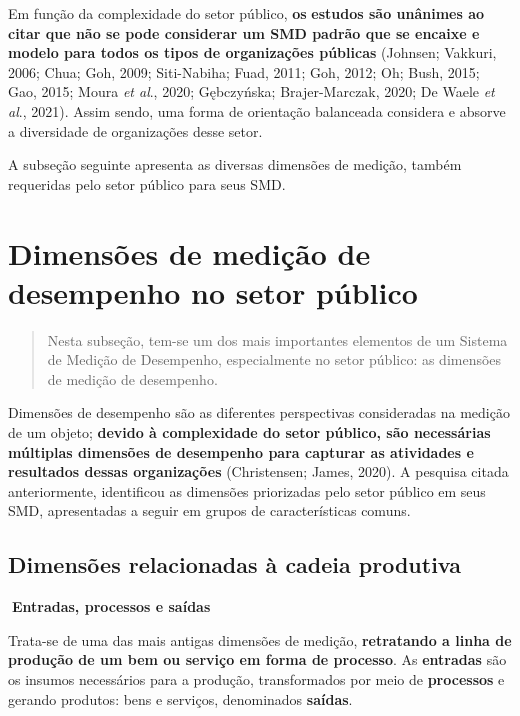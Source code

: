 \documentclass[
  letterpaper,
  DIV=11,
  numbers=noendperiod]{scrreprt}
\begin{document}
Em função da complexidade do setor público, \textbf{os} \textbf{estudos
são unânimes ao citar que não se pode considerar um SMD padrão que se
encaixe e modelo para todos os tipos de organizações públicas} (Johnsen;
Vakkuri, 2006; Chua; Goh, 2009; Siti-Nabiha; Fuad, 2011; Goh, 2012; Oh;
Bush, 2015; Gao, 2015; Moura \emph{et al}., 2020; Gębczyńska;
Brajer-Marczak, 2020; De Waele \emph{et al}., 2021). Assim sendo, uma
forma de orientação balanceada considera e absorve a diversidade de
organizações desse setor.

A subseção seguinte apresenta as diversas dimensões de medição, também
requeridas pelo setor público para seus SMD.

\hypertarget{dimensuxf5es-de-mediuxe7uxe3o-de-desempenho-no-setor-puxfablico}{%
\chapter{Dimensões de medição de desempenho no setor
público}\label{dimensuxf5es-de-mediuxe7uxe3o-de-desempenho-no-setor-puxfablico}}

\begin{quote}
Nesta subseção, tem-se um dos mais importantes elementos de um Sistema
de Medição de Desempenho, especialmente no setor público: as dimensões
de medição de desempenho.
\end{quote}

Dimensões de desempenho são as diferentes perspectivas consideradas na
medição de um objeto; \textbf{devido à complexidade do setor público,
são necessárias múltiplas dimensões de desempenho para capturar as
atividades e resultados dessas organizações} (Christensen; James, 2020).
A pesquisa citada anteriormente, identificou as dimensões priorizadas
pelo setor público em seus SMD, apresentadas a seguir em grupos de
características comuns.

\hypertarget{dimensuxf5es-relacionadas-uxe0-cadeia-produtiva}{%
\section{Dimensões relacionadas à cadeia
produtiva}\label{dimensuxf5es-relacionadas-uxe0-cadeia-produtiva}}

\begin{tcolorbox}[enhanced jigsaw, opacityback=0, toprule=.15mm, breakable, leftrule=.75mm, rightrule=.15mm, left=2mm, colback=white, arc=.35mm, bottomrule=.15mm]

\textbf{🔽{Entradas, processos e saídas}}\vspace{2mm}

Trata-se de uma das mais antigas dimensões de medição,
\textbf{retratando a linha de produção de um bem ou serviço em forma de
processo}. As \textbf{entradas} são os insumos necessários para a
produção, transformados por meio de \textbf{processos} e gerando
produtos: bens e serviços, denominados \textbf{saídas}.

\end{tcolorbox}
\end{document}
